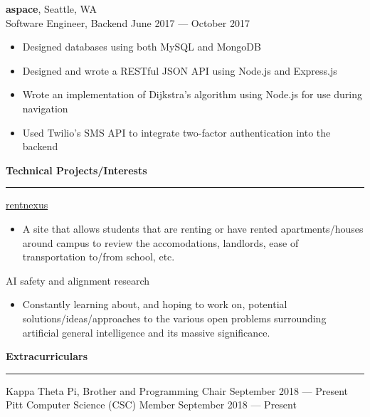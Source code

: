 \documentclass[11pt]{article}
\begin{document}
\begin{flushleft}
		\textbf{aspace}, Seattle, WA\\
		Software Engineer, Backend \hfill June 2017 --- October 2017
		\begin{itemize}
			\item Designed databases using both MySQL and MongoDB
			\item Designed and wrote a RESTful JSON API using Node.js and Express.js
			\item Wrote an implementation of Dijkstra's algorithm using Node.js for use during navigation
			\item Used Twilio's SMS API to integrate two-factor authentication into the backend
		\end{itemize}
		
		\vspace{1.75mm}
		{\large \raggedright \textbf{Technical Projects/Interests}}
		\vspace{1.5mm}
	
		\hrule
	
		\vspace{2.5mm}
		\href{https://rentnexus.net}{rentnexus}
		\begin{itemize}
			\item A site that allows students that are renting or have rented apartments/houses around campus to review the accomodations, landlords, ease of transportation to/from school, etc.
		\end{itemize}
		AI safety and alignment research
		\begin{itemize}
			\item Constantly learning about, and hoping to work on, potential solutions/ideas/approaches to the various open problems surrounding artificial general intelligence and its massive significance.
		\end{itemize}
		
		\vspace{1.75mm}
		{\large \raggedright \textbf{Extracurriculars}}
		\vspace{1.5mm}
	
		\hrule
	
		\vspace{2.5mm}
		Kappa Theta Pi, Brother and Programming Chair \hfill September 2018 --- Present\\
		Pitt Computer Science (CSC) Member \hfill September 2018 --- Present
	\end{flushleft}
\end{document}
